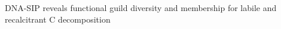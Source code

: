 DNA-SIP reveals functional guild diversity and membership for labile and
recalcitrant C decomposition
